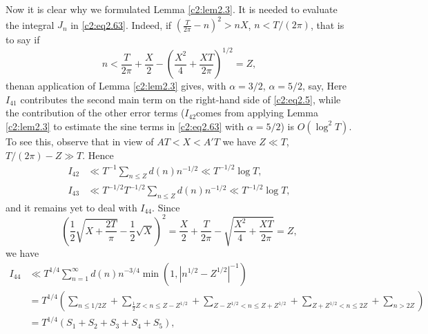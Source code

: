 Now it is clear why we formulated Lemma \ref{c2:lem2.3}. It is needed
to evaluate the integral $J_n$ in \eqref{c2:eq2.63}. Indeed, if
$\left(\frac{T}{2 \pi} - n \right)^2> nX$, $n < T/(2 \pi)$, that is to
say if 
\begin{equation}
  n < \frac{T}{2 \pi} + \frac{X}{2} - \left(\frac{X^2}{4} +
  \frac{XT}{2 \pi} \right)^{1/2}= Z,\label{c2:eq2.64}
\end{equation}
then\pageoriginale an application of Lemma \ref{c2:lem2.3} gives, with
$\alpha= 3/2$, $\alpha = 5/2$,
{}
say, Here $I_{41}$ contributes the second main term on the right-hand
side of \eqref{c2:eq2.5}, while the contribution of the other error
terms ($I_{42}$comes from applying Lemma \ref{c2:lem2.3} to estimate
the sine terms in \eqref{c2:eq2.63} with $\alpha= 5/2$) is $O(\log^2
T)$. To see this, observe that in view of $AT < X < A'T$ we have $Z\ll
T$, $T/(2 \pi) - Z \gg T$. Hence
\begin{align*}
  I_{42} & \ll T^{-1} \sum_{n \leq Z}d(n) n^{-1/2} \ll T^{-1/2} \log
  T,\\
  I_{43} & \ll T^{- 1/2} T^{-1/2} \sum_{n \leq Z} d(n) n^{-1/2} \ll
  T^{-1/2} \log T,
\end{align*}
and it remains yet to deal with $I_{44}$. Since
$$
\left(\frac{1}{2} \sqrt{X+ \frac{2T}{\pi}} - \frac{1}{2} \sqrt{X}
\right)^2 = \frac{X}{2} + \frac{T}{2 \pi} - \sqrt{\frac{X^2}{4} +
  \frac{XT}{2 \pi}}= Z,
$$
we have
\begin{align*}
   I_{44} & \ll T^{1/4} \sum_{n=1}^\infty d(n) n^{-3/4} \min (1,
  |n^{1/2}- Z^{1/2}|^{-1})\\
  & = T^{1/4} \left( \sum_{n \leq 1/2 Z} + \sum_{\frac{1}{2} Z < n
    \leq  Z- Z^{1/2}} + \sum_{Z- Z^{1/2} < n \leq Z + Z^{1/2}} +
  \sum_{Z+ Z^{1/2} < n \leq 2Z}+ \sum_{n > 2Z}\right)\\
  & = T^{1/4} (S_1 + S_2 + S_3 + S_4 + S_5),
\end{align*}
